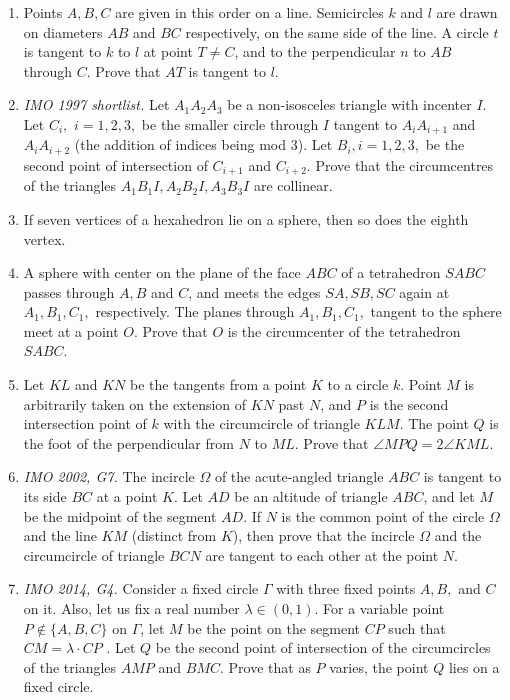 \documentclass[11pt,a4paper]{article}
\begin{document}
\begin{enumerate}
\item Points $A,B,C$ are given in this order on a line. Semicircles $k$ and $l$ are drawn on diameters $AB$ and $BC$ respectively, on the same side of the line. A circle $t$ is tangent to $k$ to $l$ at point $T\ne C$, and to the perpendicular $n$ to $AB$ through $C$. Prove that $AT$ is tangent to $l$.

\item\emph{IMO 1997 shortlist.} Let $ A_1A_2A_3$ be a non-isosceles triangle with incenter $ I.$ Let $ C_i,$ $ i = 1, 2, 3,$ be the smaller circle through $ I$ tangent to $ A_iA_{i+1}$ and $ A_iA_{i+2}$ (the addition of indices being mod 3). Let $ B_i, i = 1, 2, 3,$ be the second point of intersection of $ C_{i+1}$ and $ C_{i+2}.$ Prove that the circumcentres of the triangles $ A_1 B_1I,A_2B_2I,A_3B_3I$ are collinear.

\item If seven vertices of a hexahedron lie on a sphere, then so does the eighth vertex. 

\item A sphere with center on the plane of the face $ABC$ of a tetrahedron $SABC$ passes through $A, B$ and $C$, and meets the edges $SA, SB, SC$ again at $A_1, B_1, C_1,$ respectively. The planes through  $A_1, B_1, C_1,$ tangent to the sphere meet at a point $O$. Prove that $O$ is the circumcenter of the tetrahedron $SABC$. 

\item Let $KL$ and $KN$ be the tangents from a point $K$ to a circle $k$. Point $M$ is arbitrarily taken on the extension of $KN$ past $N$, and $P$ is the second intersection point of $k$ with the circumcircle of triangle $KLM$. The point $Q$ is the foot of the perpendicular from $N$ to $ML$. Prove that $\angle MPQ=2\angle KML$.

\item\emph {IMO 2002, G7.} The incircle $ \Omega$ of the acute-angled triangle $ ABC$ is tangent to its side $ BC$ at a point $ K$. Let $ AD$ be an altitude of triangle $ ABC$, and let $ M$ be the midpoint of the segment $ AD$. If $ N$ is the common point of the circle $ \Omega$ and the line $ KM$ (distinct from $ K$), then prove that the incircle $ \Omega$ and the circumcircle of triangle $ BCN$ are tangent to each other at the point $ N$.

\item\emph {IMO 2014, G4.} Consider a fixed circle $\Gamma$ with three fixed points $A, B,$ and $C$ on it. Also, let us fix a real number $\lambda \in(0,1)$. For a variable point $P \not\in\{A, B, C\}$ on $\Gamma$, let $M$ be the point on the segment $CP$ such that $CM =\lambda\cdot CP$ . Let $Q$ be the second point of intersection of the circumcircles of the triangles $AMP$ and $BMC$. Prove that as $P$ varies, the point $Q$ lies on a fixed circle.


\end{enumerate}
\end{document}

